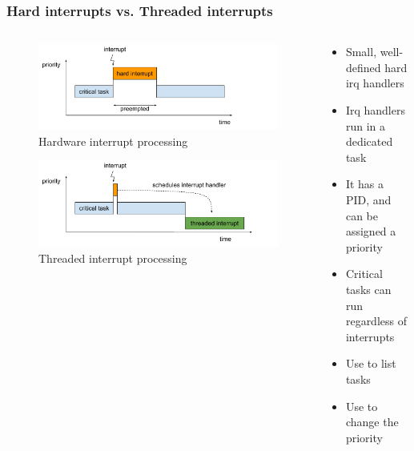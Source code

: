 \begin{frame}
	\frametitle{Hard interrupts vs. Threaded interrupts}

	\begin{columns}
	\begin{column}{0.50\textwidth}
	\vspace{-1cm}
	\begin{figure}
	\includegraphics[height=0.35\textheight]{slides/realtime-linux-realtime-systems/irq_preemption.pdf}
	\vspace{-1cm}
	\caption{Hardware interrupt processing}
	\end{figure}
	\vspace{-0.6cm}
	\begin{figure}
	\includegraphics[height=0.35\textheight]{slides/realtime-linux-preempt-rt/softirq_preemption.pdf}
	\vspace{-0.8cm}
	\caption{Threaded interrupt processing}
	\end{figure}
	\end{column}

		\begin{column}{0.50\textwidth}
			\begin{itemize}
				\item Small, well-defined hard irq handlers
				\item Irq handlers run in a dedicated task
				\item It has a PID, and can be assigned a priority
				\item Critical tasks can run regardless of interrupts
				\item Use  to list tasks
				\item Use  to change the priority
			\end{itemize}
		\end{column}
	\end{columns}
\end{frame}

